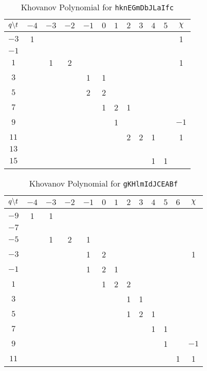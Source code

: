 \documentclass{article}
\theoremstyle{plain}
\begin{document}
        \begin{table}
            \centering
            \begin{tabular}{| c | c | c | c | c | c | c | c | c | c | c | c |}
                \hline
                $q\symbol{92}t$&$-4$&$-3$&$-2$&$-1$&$0$&$1$&$2$&$3$&$4$&$5$&$\chi$\\
                \hline
                $-3$&1&&&&&&&&&&1\\
                \hline
                $-1$&&&&&&&&&&&\\
                \hline
                $1$&&1&2&&&&&&&&1\\
                \hline
                $3$&&&&1&1&&&&&&\\
                \hline
                $5$&&&&2&2&&&&&&\\
                \hline
                $7$&&&&&1&2&1&&&&\\
                \hline
                $9$&&&&&&1&&&&&$-1$\\
                \hline
                $11$&&&&&&&2&2&1&&1\\
                \hline
                $13$&&&&&&&&&&&\\
                \hline
                $15$&&&&&&&&&1&1&\\
                \hline
            \end{tabular}
            \caption{Khovanov Polynomial for \texttt{hknEGmDbJLaIfc}}
        \end{table}
        \begin{table}
            \centering
            \begin{tabular}{| c | c | c | c | c | c | c | c | c | c | c | c | c |}
                \hline
                $q\symbol{92}t$&$-4$&$-3$&$-2$&$-1$&$0$&$1$&$2$&$3$&$4$&$5$&$6$&$\chi$\\
                \hline
                $-9$&1&1&&&&&&&&&&\\
                \hline
                $-7$&&&&&&&&&&&&\\
                \hline
                $-5$&&1&2&1&&&&&&&&\\
                \hline
                $-3$&&&&1&2&&&&&&&1\\
                \hline
                $-1$&&&&1&2&1&&&&&&\\
                \hline
                $1$&&&&&1&2&2&&&&&\\
                \hline
                $3$&&&&&&&1&1&&&&\\
                \hline
                $5$&&&&&&&1&2&1&&&\\
                \hline
                $7$&&&&&&&&&1&1&&\\
                \hline
                $9$&&&&&&&&&&1&&$-1$\\
                \hline
                $11$&&&&&&&&&&&1&1\\
                \hline
            \end{tabular}
            \caption{Khovanov Polynomial for \texttt{gKHlmIdJCEABf}}
        \end{table}
\end{document}
